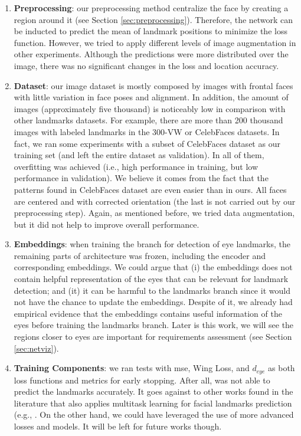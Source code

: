 \begin{enumerate}[i]
\item \textbf{Preprocessing}: our preprocessing method centralize the face by creating a region around it (see Section \ref{sec:preprocessing}). Therefore, the network can be inducted to predict the mean of landmark positions to minimize the loss function. However, we tried to apply different levels of image augmentation in other experiments. Although the predictions were more distributed over the image, there was no significant changes in the loss and location accuracy.

\item \textbf{Dataset}: our \adhoc image dataset is mostly composed by images with frontal faces with little variation in face poses and alignment. In addition, the amount of images (approximately five thousand) is noticeably low in comparison with other landmarks datasets. For example, there are more than 200 thousand images with labeled landmarks in the 300-VW \citep{tzimiropoulos2015project} or CelebFaces \citep{yang2015facial} datasets. In fact, we ran some experiments with a subset of CelebFaces dataset as our training set (and left the entire \adhoc dataset as validation). In all of them, overfitting was achieved (i.e., high performance in training, but low performance in validation). We believe it comes from the fact that the patterns found in CelebFaces dataset are even easier than in ours. All faces are centered and with corrected orientation (the last is not carried out by our preprocessing step). Again, as mentioned before, we tried data augmentation, but it did not help to improve overall performance.

\item \textbf{Embeddings}: when training the branch for detection of eye landmarks, the remaining parts of \methodname architecture was frozen, including the encoder and corresponding embeddings. We could argue that (i) the embeddings does not contain helpful representation of the eyes that can be relevant for landmark detection; and (it) it can be harmful to the landmarks branch since it would not have the chance to update the embeddings. Despite of it, we already had empirical evidence that the embeddings contains useful information of the eyes before training the landmarks branch. Later is this work, we will see the regions closer to eyes are important for requirements assessment (see Section \ref{sec:netviz}).

\item \textbf{Training Components}: we ran tests with \acs{mse}, Wing Loss, and $d_{eye}$ as both loss functions and metrics for early stopping.  After all, \methodname was not able to predict the landmarks accurately. It goes against to other works found in the literature that also applies multitask learning for facial landmarks prediction (e.g., \citep{zhang2014facial, ranjan2017hyperface, zhang2015learning}. On the other hand, we could have leveraged the use of more advanced losses and models. It will be left for future works though.

\end{enumerate}

